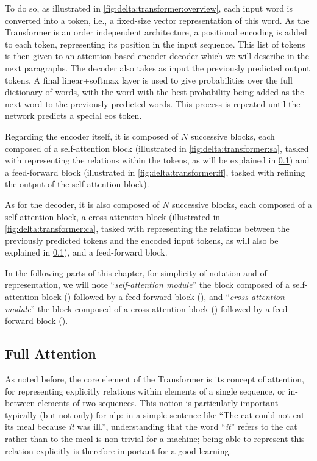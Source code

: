 To do so, as illustrated in \cref{fig:delta:transformer:overview}, each input word is converted into a token, i.e., a fixed-size vector representation of this word. As the Transformer is an order independent architecture, a positional encoding is added to each token, representing its position in the input sequence. This list of tokens is then given to an attention-based encoder-decoder which we will describe in the next paragraphs. The decoder also takes as input the previously predicted output tokens. A final linear+softmax layer is used to give probabilities over the full dictionary of words, with the word with the best probability being added as the next word to the previously predicted words. This process is repeated until the network predicts a special \acrfull{eos} token.

Regarding the encoder itself, it is composed of \(N\) successive blocks, each composed of a self-attention block (illustrated in \cref{fig:delta:transformer:sa}, tasked with representing the relations within the tokens, as will be explained in \cref{sec:delta:intro_transf_att:full_att}) and a feed-forward block (illustrated in \cref{fig:delta:transformer:ff}, tasked with refining the output of the self-attention block).

As for the decoder, it is also composed of \(N\) successive blocks, each composed of a self-attention block, a cross-attention block (illustrated in \cref{fig:delta:transformer:ca}, tasked with representing the relations between the previously predicted tokens and the encoded input tokens, as will also be explained in \cref{sec:delta:intro_transf_att:full_att}), and a feed-forward block.

In the following parts of this chapter, for simplicity of notation and of representation, we will note ``\textit{self-attention module}'' the block composed of a self-attention block (\smbluesquare{}) followed by a feed-forward block (\smyellowsquare{}), and ``\textit{cross-attention module}'' the block composed of a cross-attention block (\smdarkbluesquare{}) followed by a feed-forward block (\smyellowsquare{}).

\subsection{Full Attention}\label{sec:delta:intro_transf_att:full_att}
As noted before, the core element of the Transformer is its concept of attention, for representing explicitly relations within elements of a single sequence, or in-between elements of two sequences. This notion is particularly important typically (but not only) for \acrshort{nlp}: in a simple sentence like ``The cat could not eat its meal because \textit{it} was ill.'', understanding that the word ``\textit{it}'' refers to the cat rather than to the meal is non-trivial for a machine; being able to represent this relation explicitly is therefore important for a good learning.

